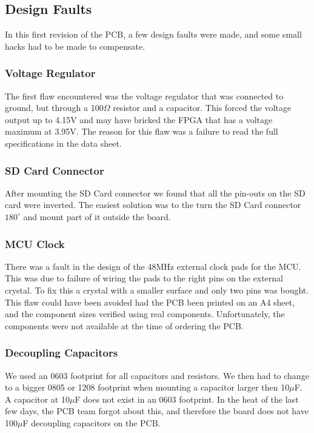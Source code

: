 \subsection{Design Faults}
In this first revision of the PCB, a few design faults were made, and some small hacks had to be made to compensate.

\subsubsection{Voltage Regulator}
The first flaw encountered was the voltage regulator that was connected to ground, but through a 100$\Omega$ resistor and a capacitor.
This forced the voltage output up to 4.15V and may have bricked the FPGA that has a voltage maximum at 3.95V.
The reason for this flaw was a failure to read the full specifications in the data sheet.

\subsubsection{SD Card Connector}
After mounting the SD Card connector we found that all the pin-outs on the SD card were inverted.
The easiest solution was to the turn the SD Card connector $180^{\circ}$ and mount part of it outside the board.

\subsubsection{MCU Clock}
There was a fault in the design of the 48MHz external clock pads for the MCU. This was due to failure of wiring the pads to the right pins on the external crystal.
To fix this a crystal with a smaller surface and only two pins was bought.
This flaw could have been avoided had the PCB been printed on an A4 sheet, and the component sizes verified using real components.
Unfortunately, the components were not available at the time of ordering the PCB.

\subsubsection{Decoupling Capacitors}
We used an 0603 footprint for all capacitors and resistors.
We then had to change to a bigger 0805 or 1208 footprint when mounting a capacitor larger then 10$\mu$F.
A capacitor at 10$\mu$F does not exist in an 0603 footprint.
In the heat of the last few days, the PCB team forgot about this, and therefore the board does not have 100$\mu$F decoupling capacitors on the PCB.


